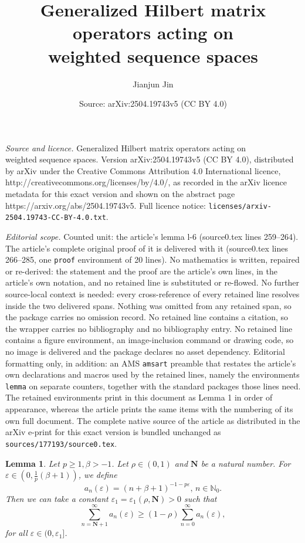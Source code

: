 \documentclass[10pt,a4paper]{amsart}
\title{Generalized Hilbert matrix operators acting on\\ weighted sequence spaces}
\author{Jianjun Jin}
\date{Source: arXiv:2504.19743v5 (CC BY 4.0)}
\newtheorem{lemma}{Lemma}
\begin{document}
\maketitle

\noindent\emph{Source and licence.} Generalized Hilbert matrix operators acting on\\ weighted sequence spaces. Version arXiv:2504.19743v5 (CC BY 4.0), distributed by arXiv under the Creative Commons Attribution 4.0 International licence, http://creativecommons.org/licenses/by/4.0/, as recorded in the arXiv licence metadata for this exact version and shown on the abstract page https://arxiv.org/abs/2504.19743v5. Full licence notice: \texttt{licenses/arxiv-2504.19743-CC-BY-4.0.txt}.\par\smallskip

\noindent\textit{Editorial scope.} Counted unit: the article's lemma l-6 (source0.tex lines 259--264). The article's complete original proof of it is delivered with it (source0.tex lines 266--285, one \texttt{proof} environment of 20 lines). No mathematics is written, repaired or re-derived: the statement and the proof are the article's own lines, in the article's own notation, and no retained line is substituted or re-flowed.  No further source-local context is needed: every cross-reference of every retained line resolves inside the two delivered spans.  Nothing was omitted from any retained span, so the package carries no omission record.  No retained line contains a citation, so the wrapper carries no bibliography and no bibliography entry.  No retained line contains a figure environment, an image-inclusion command or drawing code, so no image is delivered and the package declares no asset dependency.  Editorial formatting only, in addition: an AMS \texttt{amsart} preamble that restates the article's own declarations and macros used by the retained lines, namely the environments \texttt{lemma} on separate counters, together with the standard packages those lines need.  The retained environments print in this document as Lemma 1 in order of appearance, whereas the article prints the same items with the numbering of its own full document.  The complete native source of the article as distributed in the arXiv e-print for this exact version is bundled unchanged as \texttt{sources/177193/source0.tex}.
\begin{lemma}\label{l-6}
Let $p\geq 1, \beta>-1$. Let $\rho\in (0,1)$ and $\mathbf{N}$ be a natural number. For $\varepsilon\in (0, \frac{1}{p}(\beta+1))$, we define $$a_n(\varepsilon)=(n+\beta+1)^{-1-p\varepsilon},\, n\in \mathbb{N}_0.$$ 
Then we can take a constant $\varepsilon_1=\varepsilon_1(\rho, \mathbf{N})>0$ such that
$$\sum_{n=\mathbf{N}+1}^{\infty}a_n(\varepsilon)\geq (1-\rho)\sum_{n=0}^{\infty}a_n(\varepsilon),$$
for all $\varepsilon\in (0, \varepsilon_1]$. 
\end{lemma}
\end{document}
